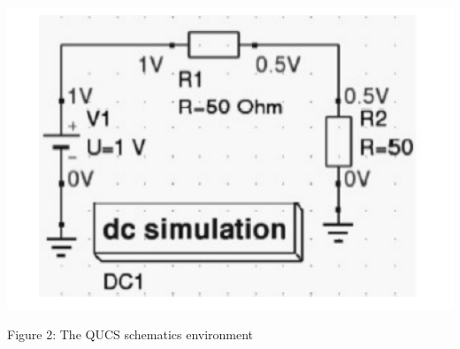 \documentclass{report}
\begin{document}
\includegraphics{Fig}
\begin{center}
Figure 2: The QUCS schematics environment
\end{center}
\end{document}
